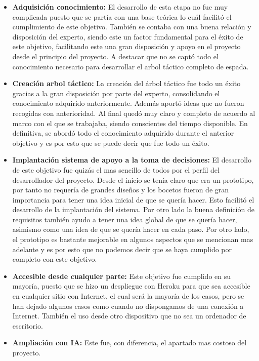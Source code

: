 \begin{itemize}
  \item \textbf{Adquisición conocimiento:} El desarrollo de esta etapa no fue muy complicada
    puesto que se partía con una base teórica lo cuál facilitó el cumplimiento de este objetivo.
    También se contaba con una buena relación y disposición del experto, siendo este un factor
    fundamental para el éxito de este objetivo, facilitando este una gran disposición y apoyo
    en el proyecto desde el principio del proyecto. A destacar que no se captó todo el conocimiento
    necesario para desarrollar el arbol táctico completo de espada.
  \item \textbf{Creación arbol táctico:} La creación del árbol táctico fue todo un éxito gracias
    a la gran disposición por parte del experto, consolidando el conocimiento adquirido anteriormente.
    Además aportó ideas que no fueron recogidas con anterioridad. Al final quedó muy claro y completo
    de acuerdo al marco con el que se trabajaba, siendo conscientes del tiempo disponible. En definitiva,
    se abordó todo el conocimiento adquirido durante el anterior objetivo y es por esto que se
    puede decir que fue todo un éxito.
  \item \textbf{Implantación sistema de apoyo a la toma de decisiones:} El desarrollo de este
    objetivo fue quizás el mas sencillo de todos por el perfil del desarrollador del proyecto.
    Desde el inicio se tenía claro que era un prototipo, por tanto no requería de grandes diseños
    y los bocetos fueron de gran importancia para tener una idea inicial de que se quería hacer.
    Esto facilitó el desarrollo de la implantación del sistema. Por otro lado la buena definición
    de requisitos también ayudo a tener una idea global de que se quería hacer, asimismo como
    una idea de que se quería hacer en cada paso. Por otro lado, el prototipo es bastante mejorable
    en algunos aspectos que se mencionan mas adelante y es por esto que no podemos decir que se
    haya cumplido por completo con este objetivo.
  \item \textbf{Accesible desde cualquier parte:} Este objetivo fue cumplido en su mayoría, puesto
    que se hizo un despliegue con Heroku para que sea accesible en cualquier sitio con Internet,
    el cual será la mayoría de los casos, pero se han dejado algunos casos como cuando no dispongamos
    de una conexión a Internet. También el uso desde otro dispositivo que no sea un ordenador de
    escritorio.
  \item \textbf{Ampliación con IA:} Este fue, con diferencia, el apartado mas costoso del proyecto.

\end{itemize}
